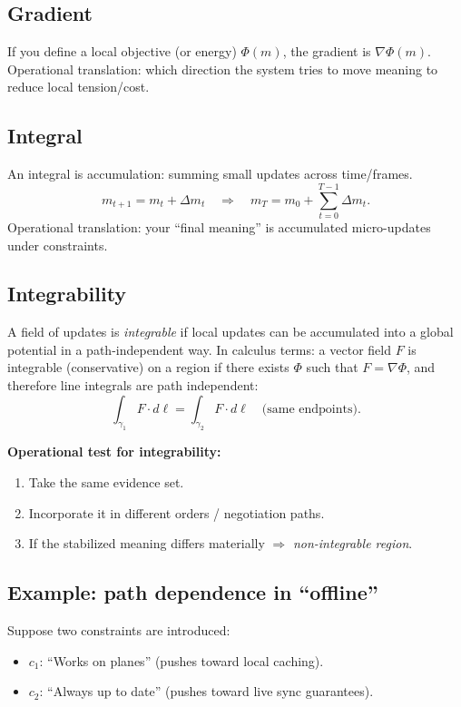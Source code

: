 \documentclass[11pt]{article}
\begin{document}
\subsection{Gradient}

If you define a local objective (or energy) $\Phi(m)$, the gradient is $\nabla\Phi(m)$. Operational translation: which direction the system tries to move meaning to reduce local tension/cost.

\subsection{Integral}

An integral is accumulation: summing small updates across time/frames.
\[
  m_{t+1}=m_t + \Delta m_t \quad \Rightarrow \quad m_T = m_0 + \sum_{t=0}^{T-1}\Delta m_t.
\]
Operational translation: your ``final meaning'' is accumulated micro-updates under constraints.

\subsection{Integrability}

A field of updates is \emph{integrable} if local updates can be accumulated into a global potential in a path-independent way. In calculus terms: a vector field $F$ is integrable (conservative) on a region if there exists $\Phi$ such that $F=\nabla\Phi$, and therefore line integrals are path independent:
\[
  \int_{\gamma_1} F\cdot d\ell = \int_{\gamma_2} F\cdot d\ell \quad \text{(same endpoints)}.
\]

\textbf{Operational test for integrability:}
\begin{enumerate}[leftmargin=2em]
  \item Take the same evidence set.
  \item Incorporate it in different orders / negotiation paths.
  \item If the stabilized meaning differs materially $\Rightarrow$ \emph{non-integrable region}.
\end{enumerate}

\subsection{Example: path dependence in ``offline''}

Suppose two constraints are introduced:
\begin{itemize}[leftmargin=2em]
  \item $c_1$: ``Works on planes'' (pushes toward local caching).
  \item $c_2$: ``Always up to date'' (pushes toward live sync guarantees).
\end{itemize}
\end{document}

